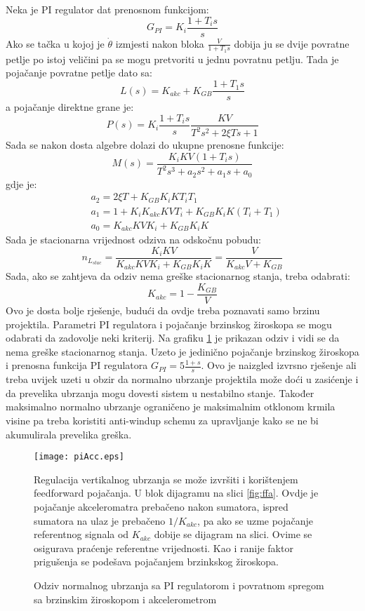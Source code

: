 Neka je PI regulator dat prenosnom funkcijom:
\begin{equation}
    G_{PI} = K_i\frac{1+T_is}{s}
\end{equation}
Ako se tačka u kojoj je $\dot{\theta}$ izmjesti nakon bloka $\frac{V}{1+T_1s}$ dobija ju se 
dvije povratne petlje po istoj veličini pa se mogu pretvoriti u jednu povratnu petlju. Tada je 
pojačanje povratne petlje dato sa:
\begin{equation}
    L(s) = K_{akc}+K_{GB}\frac{1+T_1s}{s}
\end{equation}
a pojačanje direktne grane je:
\begin{equation}
    P(s)=K_i\frac{1+T_is}{s}\frac{KV}{T^2s^2+2\xi Ts+1}
\end{equation}
Sada se nakon dosta algebre dolazi do ukupne prenosne funkcije:
\begin{equation}
    M(s)=\frac{K_iKV(1+T_is)}{T^2s^3+a_2s^2+a_1s + a_0}
\end{equation}
gdje je:
\begin{align*}
    & a_2 = 2\xi T+K_{GB}K_iKT_iT_1 \\
    & a_1 = 1+K_iK_{akc}KVT_i+K_{GB}K_iK(T_i+T_1)\\
    & a_0 = K_{akc}KVK_i+K_{GB}K_iK
\end{align*}
Sada je stacionarna vrijednost odziva na odskočnu pobudu:
\begin{equation}
    n_{L_{stac}} = \frac{K_iKV}{K_{akc}KVK_i+K_{GB}K_iK} = \frac{V}{K_{akc}V+K_{GB}}
\end{equation}
Sada, ako se zahtjeva da odziv nema greške stacionarnog stanja, treba odabrati:
\begin{equation}
    K_{akc} = 1-\frac{K_{GB}}{V}
\end{equation}
Ovo je dosta bolje rješenje, budući da ovdje treba poznavati samo brzinu projektila. Parametri 
PI regulatora i pojačanje brzinskog žiroskopa se mogu odabrati da zadovolje neki kriterij. 
Na grafiku \ref{fig:piAcc} je prikazan odziv i vidi se da nema greške stacionarnog stanja. 
Uzeto je jedinično pojačanje brzinskog žiroskopa i prenosna funkcija PI regulatora $G_{PI}=5\frac{1+s}{s}$. 
Ovo je naizgled izvrsno rješenje ali treba uvijek uzeti u obzir da normalno ubrzanje projektila 
može doći u zasićenje i da prevelika ubrzanja mogu dovesti sistem u nestabilno stanje. Također 
maksimalno normalno ubrzanje ograničeno je maksimalnim otklonom krmila visine pa treba koristiti 
anti-windup schemu za upravljanje kako se ne bi akumulirala prevelika greška.  
\begin{figure}[!ht]
    \centering
    \texttt{[image: piAcc.eps]}
    \caption{Odziv normalnog ubrzanja sa PI regulatorom i povratnom spregom 
    sa brzinskim žiroskopom i akcelerometrom}
    \label{fig:piAcc}
Regulacija vertikalnog ubrzanja se može izvršiti i korištenjem feedforward pojačanja. U blok 
dijagramu na slici \ref{fig:ffa}. Ovdje je pojačanje akceleromatra prebačeno nakon sumatora, 
ispred sumatora na ulaz je prebačeno $1/K_{akc}$, pa ako se uzme pojačanje referentnog signala 
od $K_{akc}$ dobije se dijagram na slici. Ovime se osigurava praćenje referentne vrijednosti. Kao i ranije 
faktor prigušenja se podešava pojačanjem brzinkskog žiroskopa.  
\end{figure}
